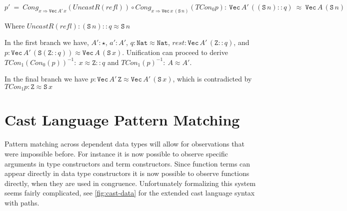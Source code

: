 $p'\ =\ Cong_{x\Rightarrow \mathtt{Vec}\,A'\,x}\left(UncastR\left(refl\right)\right)\circ Cong_{x\Rightarrow \mathtt{Vec}\,x\,\left(\mathtt{S}\,n\right)}\left(TCon_{0}p\right):\ \mathtt{Vec}\,A'\,\left(\left(\mathtt{S}\,n\right)::q\right)\ \approx\ \mathtt{Vec}\,A\,\left(\mathtt{S}\,n\right)$

Where 
$UncastR\left(refl\right): \left(\mathtt{S}\,n\right)::q  \approx \mathtt{S}\,n $

In the first branch we have, 
  $A':\star$, $a':A'$,
  $q:\mathtt{Nat}\approx \mathtt{Nat}$,
  $rest:\mathtt{Vec}\,A'\,\left(\mathtt{Z}::q\right)$, 
  and $p:\mathtt{Vec}\,A'\,\left(\mathtt{S}\left(\mathtt{Z}::q\right)\right)\approx \mathtt{Vec}\,A\,\left(\mathtt{S}\,x\right)$.
Unification can proceed to derive $TCon_{1}\left(Con_{0}\left(p\right)\right)^{-1}:\ x\approx \mathtt{Z}::q$
and $TCon_{1}\left(p\right)^{-1}:\ A\approx A'$.

In the final branch we have $p:\mathtt{Vec}\,A'\,\mathtt{Z}\approx \mathtt{Vec}\,A'\,\left(\mathtt{S}\,x\right)$,
which is contradicted by $TCon_{1}p:\mathtt{Z}\approx \mathtt{S}\,x$


\section{Cast Language Pattern Matching}

Pattern matching across dependent data types will allow for observations that were impossible before.
For instance it is now possible to observe specific arguments in type constructors and term constructors.
Since function terms can appear directly in data type constructors it is now possible to observe functions directly, when they are used in congruence.
Unfortunately formalizing this system seems fairly complicated, see \ref{fig:cast-data} for the extended cast language syntax with paths. 

